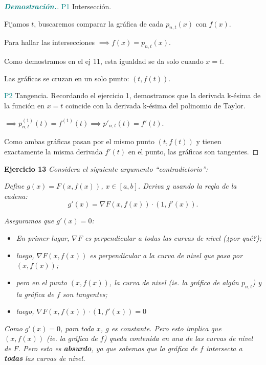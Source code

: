 \documentclass[12pt, letterpaper]{article}
\begin{document}
\begin{proof}[\textbf{\textcolor{teal}{Demostración.}}]
    {\textcolor{teal}{P1}} Intersección. 
    
    Fijamos $t$, buscaremos comparar la gráfica de cada $p_{n,t}(x)$ con $f(x)$. 
    
    Para hallar las intersecciones $\implies f(x) = p_{n,t}(x)$. 
    
    Como demostramos en el ej 11, esta igualdad se da solo cuando $x=t$. 
    
    Las gráficas se cruzan en un solo punto: $(t, f(t))$.
    
    {\textcolor{teal}{P2}} Tangencia. Recordando el ejercicio 1, demostramos que la derivada k-ésima de la función en $x=t$ coincide con la derivada k-ésima del polinomio de Taylor.
    
    $\implies p_{n,t}^{(1)}(t) = f^{(1)}(t) \implies p'_{n,t}(t) = f'(t)$.
    
    Como ambas gráficas pasan por el mismo punto $(t, f(t))$ y tienen exactamente la misma derivada $f'(t)$ en el punto, las gráficas son tangentes.
\end{proof}

\vspace{0.4cm}
\noindent \textbf{Ejercicio 13} \textit{Considera el siguiente argumento ``contradictorio'':}

\noindent \textit{Define $g(x) = F(x, f(x))$, $x \in [a,b]$. Deriva $g$ usando la regla de la cadena:}
\[ g'(x) = \nabla F(x, f(x)) \cdot (1, f'(x)). \]

\noindent \textit{Aseguramos que $g'(x) = 0$:}
\begin{itemize}
    \item \textit{En primer lugar, $\nabla F$ es perpendicular a todas las curvas de nivel (¿por qué?);}
    \item \textit{luego, $\nabla F(x, f(x))$ es perpendicular a la curva de nivel que pasa por $(x, f(x))$;}
    \item \textit{pero en el punto $(x, f(x))$, la curva de nivel (ie. la gráfica de algún $p_{n,t}$) y la gráfica de $f$ son tangentes;}
    \item \textit{luego, $\nabla F(x, f(x)) \cdot (1, f'(x)) = 0$}
\end{itemize}

\noindent \textit{Como $g'(x) = 0$, para toda $x$, $g$ es constante. Pero esto implica que $(x, f(x))$ (ie. la gráfica de $f$) queda contenida en una de las curvas de nivel de $F$. Pero esto es \textbf{absurdo}, ya que sabemos que la gráfica de $f$ intersecta a \textbf{todas} las curvas de nivel.}
\end{document}
